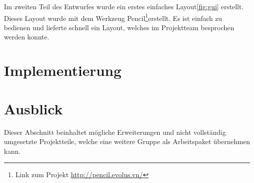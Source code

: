 Im zweiten Teil des Entwurfes wurde ein erstes einfaches Layout\ref{fig:gui} erstellt. Dieses Layout wurde mit dem Werkzeug Pencil\footnote{Link zum Projekt \url{http://pencil.evolus.vn/}}erstellt. Es ist einfach zu bedienen und lieferte schnell ein Layout, welches im Projektteam besprochen werden konnte.

\section{Implementierung}
 
\section{Ausblick}
Dieser Abschnitt beinhaltet mögliche Erweiterungen und nicht vollständig umgesetzte Projektteile, welche eine weitere Gruppe als Arbeitspaket übernehmen kann. 




